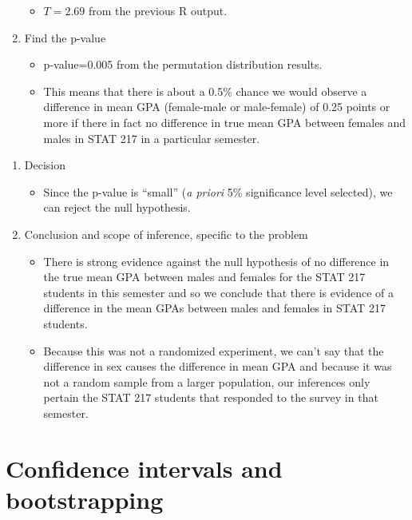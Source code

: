 \documentclass[]{book}
\providecommand{\tightlist}{%
  \setlength{\itemsep}{0pt}\setlength{\parskip}{0pt}}
\theoremstyle{definition}
\theoremstyle{definition}
\theoremstyle{remark}
\begin{document}
\begin{enumerate}
  \begin{itemize}
  \tightlist
  \item
    \(T=2.69\) from the previous R output.
  \end{itemize}
\item
  Find the p-value

  \begin{itemize}
  \item
    p-value=0.005 from the permutation distribution results.
  \item
    This means that there is about a 0.5\% chance we would observe a
    difference in mean GPA (female-male or male-female) of 0.25 points
    or more if there in fact no difference in true mean GPA between
    females and males in STAT 217 in a particular semester.
  \end{itemize}
\end{enumerate}

\newpage

\begin{enumerate}
\def\labelenumi{\arabic{enumi}.}
\setcounter{enumi}{4}
\item
  Decision

  \begin{itemize}
  \tightlist
  \item
    Since the p-value is ``small'' (\emph{a priori} 5\% significance
    level selected), we can reject the null hypothesis.
  \end{itemize}
\item
  Conclusion and scope of inference, specific to the problem

  \begin{itemize}
  \item
    There is strong evidence against the null hypothesis of no
    difference in the true mean GPA between males and females for the
    STAT 217 students in this semester and so we conclude that there is
    evidence of a difference in the mean GPAs between males and females
    in STAT 217 students.
  \item
    Because this was not a randomized experiment, we can't say that the
    difference in sex causes the difference in mean GPA and because it
    was not a random sample from a larger population, our inferences
    only pertain the STAT 217 students that responded to the survey in
    that semester.
  \end{itemize}
\end{enumerate}

\section{Confidence intervals and bootstrapping}\label{section2-8}
\end{document}
